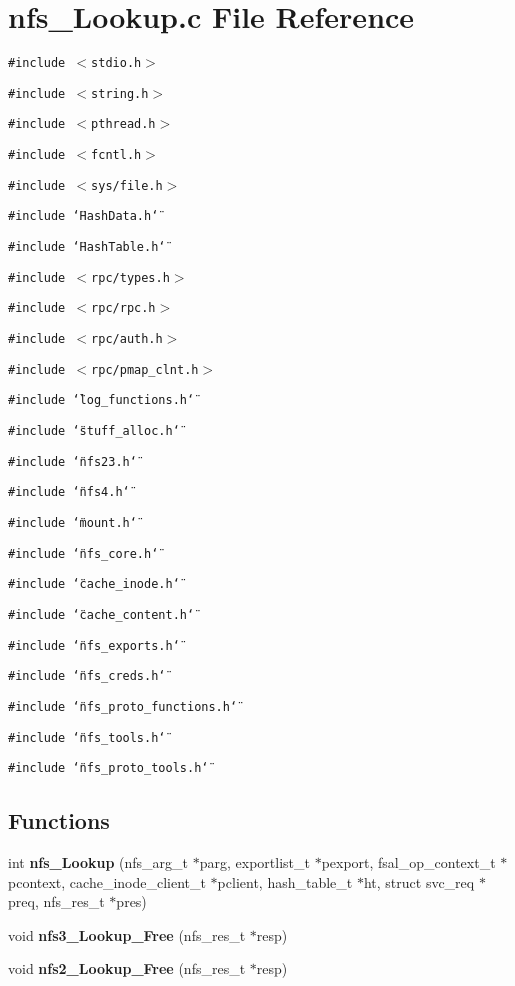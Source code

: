 \section{nfs\_\-Lookup.c File Reference}
\label{nfs__Lookup_8c}
{\tt \#include $<$stdio.h$>$}\par
{\tt \#include $<$string.h$>$}\par
{\tt \#include $<$pthread.h$>$}\par
{\tt \#include $<$fcntl.h$>$}\par
{\tt \#include $<$sys/file.h$>$}\par
{\tt \#include \char`\"{}HashData.h\char`\"{}}\par
{\tt \#include \char`\"{}HashTable.h\char`\"{}}\par
{\tt \#include $<$rpc/types.h$>$}\par
{\tt \#include $<$rpc/rpc.h$>$}\par
{\tt \#include $<$rpc/auth.h$>$}\par
{\tt \#include $<$rpc/pmap\_\-clnt.h$>$}\par
{\tt \#include \char`\"{}log\_\-functions.h\char`\"{}}\par
{\tt \#include \char`\"{}stuff\_\-alloc.h\char`\"{}}\par
{\tt \#include \char`\"{}nfs23.h\char`\"{}}\par
{\tt \#include \char`\"{}nfs4.h\char`\"{}}\par
{\tt \#include \char`\"{}mount.h\char`\"{}}\par
{\tt \#include \char`\"{}nfs\_\-core.h\char`\"{}}\par
{\tt \#include \char`\"{}cache\_\-inode.h\char`\"{}}\par
{\tt \#include \char`\"{}cache\_\-content.h\char`\"{}}\par
{\tt \#include \char`\"{}nfs\_\-exports.h\char`\"{}}\par
{\tt \#include \char`\"{}nfs\_\-creds.h\char`\"{}}\par
{\tt \#include \char`\"{}nfs\_\-proto\_\-functions.h\char`\"{}}\par
{\tt \#include \char`\"{}nfs\_\-tools.h\char`\"{}}\par
{\tt \#include \char`\"{}nfs\_\-proto\_\-tools.h\char`\"{}}\par
\subsection*{Functions}
\begin{CompactItemize}
\item 
int {\bf nfs\_\-Lookup} (nfs\_\-arg\_\-t $\ast$parg, exportlist\_\-t $\ast$pexport, fsal\_\-op\_\-context\_\-t $\ast$pcontext, cache\_\-inode\_\-client\_\-t $\ast$pclient, hash\_\-table\_\-t $\ast$ht, struct svc\_\-req $\ast$preq, nfs\_\-res\_\-t $\ast$pres)
\item 
void {\bf nfs3\_\-Lookup\_\-Free} (nfs\_\-res\_\-t $\ast$resp)
\item 
void {\bf nfs2\_\-Lookup\_\-Free} (nfs\_\-res\_\-t $\ast$resp)
\end{CompactItemize}



